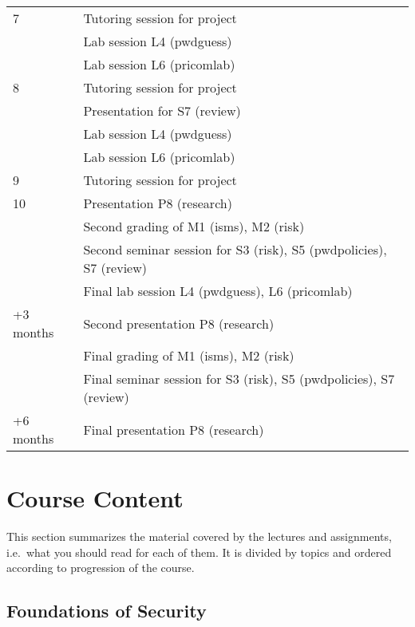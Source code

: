 \begin{table}
\begin{tabular}{lp{9cm}}
    \midrule
    7
      & Tutoring session for project\\
      & Lab session L4 (pwdguess)\\
      & Lab session L6 (pricomlab)\\
    \midrule
    8
      & Tutoring session for project\\
      & Presentation for S7 (review)\\
      & Lab session L4 (pwdguess)\\
      & Lab session L6 (pricomlab)\\
    \midrule
    9
      & Tutoring session for project\\
    \midrule
    10
      & Presentation P8 (research)\\
      & Second grading of M1 (isms), M2 (risk)\\
      & Second seminar session for S3 (risk), S5 (pwdpolicies), S7 (review)\\
      & Final lab session L4 (pwdguess), L6 (pricomlab)\\
    \midrule
    +3 months
      & Second presentation P8 (research)\\
      & Final grading of M1 (isms), M2 (risk)\\
      & Final seminar session for S3 (risk), S5 (pwdpolicies), S7 (review)\\
    \midrule
    +6 months
      & Final presentation P8 (research)\\
    \bottomrule
  \end{tabular}
\end{table}


\section{Course Content}

This section summarizes the material covered by the lectures and assignments, 
i.e.~what you should read for each of them.
It is divided by topics and ordered according to progression of the course.

\subsection{Foundations of Security}


%
%
